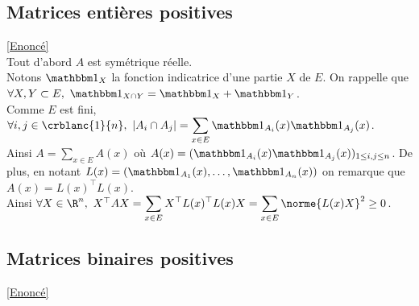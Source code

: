 \documentclass[8pt]{book}
\begin{document}
	\subsection{Matrices entières positives }
	\label{Matrices entières positives corrigé}
	\textcolor{blue}{\hyperref[Matrices entières positives]{[Enoncé]}}\\
	Tout d'abord $A$ est symétrique réelle.\\
	Notons $\mathbbm 1_X$ la fonction indicatrice d'une partie $X$ de $E$. On rappelle que $\forall X,Y\subset E,\ \mathbbm 1_{X\cap Y}=\mathbbm 1_X+\mathbbm 1_Y$.\\
	Comme $E$ est fini, $\forall i,j\in \crblanc{1}{n},\ |A_i\cap A_j|=\displaystyle\sum_{x\in E}\mathbbm 1_{A_i}(x)\mathbbm 1_{A_j}(x)$.\\
	Ainsi $A=\displaystyle\sum_{x\in E}A(x)$ où $A(x)=(\mathbbm 1_{A_i}(x)\mathbbm 1_{A_j}(x))_{1\leq i,j\leq n}$. De plus, en notant $L(x)=(\mathbbm 1_{A_1}(x),\dots,\mathbbm 1_{A_n}(x))$ on remarque que $A(x)=L(x)^\top L(x)$.\\
	Ainsi $\forall X\in \R^n,\ X^\top AX=\displaystyle\sum_{x\in E}X^\top L(x)^\top L(x)X=\sum_{x\in E}\norme{L(x)X}^2\geq 0$.
	
	\subsection{Matrices binaires positives}
	\label{Matrices binaires positives corrigé}
	\textcolor{blue}{\hyperref[Matrices binaires positives]{[Enoncé]}}\\
	
\end{document}
